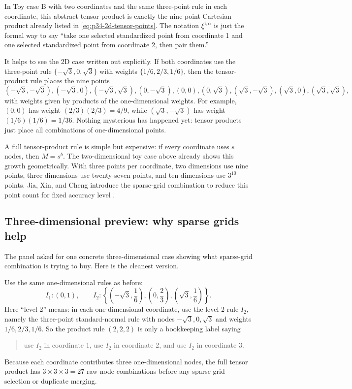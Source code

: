 \documentclass[11pt]{article}
\numberwithin{equation}{section}
\begin{document}
In Toy case B with two coordinates and the same three-point rule in each
coordinate, this abstract tensor product is exactly the nine-point Cartesian
product already listed in \eqref{eq:p34-2d-tensor-points}.  The notation
\(\xi^{\mathbf i,\alpha}\) is just the formal way to say ``take one selected
standardized point from coordinate 1 and one selected standardized point from
coordinate 2, then pair them.''

It helps to see the 2D case written out explicitly.  If both coordinates use the
three-point rule \(\{-\sqrt3,0,\sqrt3\}\) with weights
\(\{1/6,2/3,1/6\}\), then the tensor-product rule places the nine points
\begin{equation}
  (-\sqrt3,-\sqrt3),
  (-\sqrt3,0),
  (-\sqrt3,\sqrt3),
  (0,-\sqrt3),
  (0,0),
  (0,\sqrt3),
  (\sqrt3,-\sqrt3),
  (\sqrt3,0),
  (\sqrt3,\sqrt3),
  \label{eq:p35-nine-point-grid}
\end{equation}
with weights given by products of the one-dimensional weights.  For example,
\((0,0)\) has weight \((2/3)(2/3)=4/9\), while
\((\sqrt3,-\sqrt3)\) has weight \((1/6)(1/6)=1/36\).  Nothing mysterious has
happened yet: tensor products just place all combinations of one-dimensional
points.

A full tensor-product rule is simple but expensive: if every coordinate uses
\(s\) nodes, then \(M=s^b\).  The two-dimensional toy case above already shows
this growth geometrically.  With three points per coordinate, two dimensions use
nine points, three dimensions use twenty-seven points, and ten dimensions use
\(3^{10}\) points.  Jia, Xin, and Cheng introduce the sparse-grid
combination to reduce this point count for fixed accuracy level
\cite[Section 3]{jia2012sparsegrid}.

\subsection{Three-dimensional preview: why sparse grids help}
\label{subsec:p37-3d-preview}

The panel asked for one concrete three-dimensional case showing what sparse-grid
combination is trying to buy.  Here is the cleanest version.

Use the same one-dimensional rules as before:
\begin{equation}
  I_1:(0,1),
  \qquad
  I_2:\left\{\left(-\sqrt3,\frac16\right),\left(0,\frac23\right),
  \left(\sqrt3,\frac16\right)\right\}.
  \label{eq:p37-level1-level2-rules}
\end{equation}
Here ``level 2'' means: in each one-dimensional coordinate, use the level-2 rule
\(I_2\), namely the three-point standard-normal rule with nodes
\(-\sqrt3,0,\sqrt3\) and weights \(1/6,2/3,1/6\).  So the product rule
\((2,2,2)\) is only a bookkeeping label saying
\begin{quote}
use \(I_2\) in coordinate 1, use \(I_2\) in coordinate 2, and use \(I_2\) in
coordinate 3.
\end{quote}
Because each coordinate contributes three one-dimensional nodes, the full tensor
product has \(3\times 3\times 3=27\) raw node combinations before any sparse-grid
selection or duplicate merging.
\end{document}
